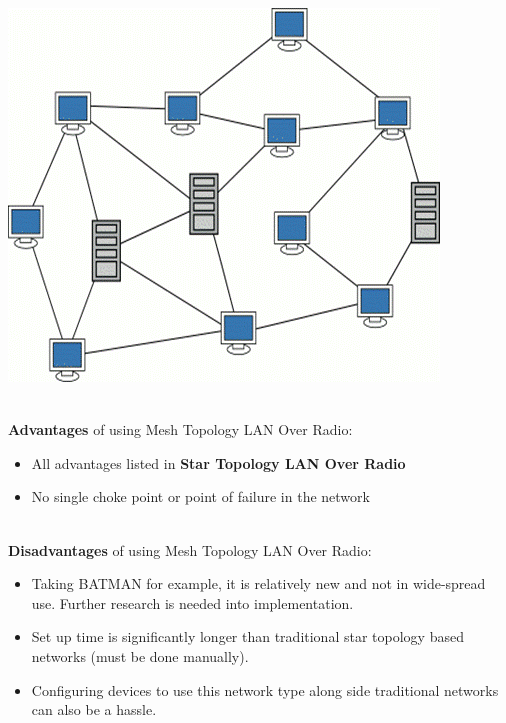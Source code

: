 	\begin{center}
		\includegraphics[scale=0.6]{techreview/mesh_topology.png}
	\end{center} \cite{IMG2}

	\noindent \\ \textbf{Advantages} of using Mesh Topology LAN Over Radio:
	\begin{itemize}
		\item All advantages listed in \textbf{Star Topology LAN Over Radio}
		\item No single choke point or point of failure in the network
	\end{itemize}

	\noindent \\ \textbf{Disadvantages} of using Mesh Topology LAN Over Radio:
	\begin{itemize}
		\item Taking BATMAN for example, it is relatively new and not in wide-spread use.  Further research is needed into implementation.
		\item Set up time is significantly longer than traditional star topology based networks (must be done manually).
		\item Configuring devices to use this network type along side traditional networks can also be a hassle.
	\end{itemize}


